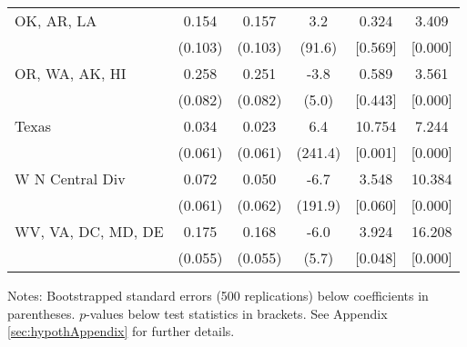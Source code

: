 \begin{landscape}
\begin{table}[ht]
{\begin{threeparttable}
\begin{tabular}{lccccc}
OK, AR, LA & 0.154 & 0.157 & 3.2 & 0.324 & 3.409 \\ 
 & (0.103) & (0.103) & (91.6) & [0.569] & [0.000] \\ 
OR, WA, AK, HI & 0.258 & 0.251 & -3.8 & 0.589 & 3.561 \\ 
 & (0.082) & (0.082) & (5.0) & [0.443] & [0.000] \\ 
Texas & 0.034 & 0.023 & 6.4 & 10.754 & 7.244 \\ 
 & (0.061) & (0.061) & (241.4) & [0.001] & [0.000] \\ 
W N Central Div & 0.072 & 0.050 & -6.7 & 3.548 & 10.384 \\ 
 & (0.061) & (0.062) & (191.9) & [0.060] & [0.000] \\ 
WV, VA, DC, MD, DE & 0.175 & 0.168 & -6.0 & 3.924 & 16.208 \\ 
 & (0.055) & (0.055) & (5.7) & [0.048] & [0.000] \\ 
\bottomrule
\end{tabular}
{\footnotesize {\raggedright Notes: Bootstrapped standard errors (500 replications) below coefficients in parentheses. $p$-values below test statistics in brackets. See Appendix \ref{sec:hypothAppendix} for further details.}}
\end{threeparttable}
}
\end{table}
\end{landscape}
